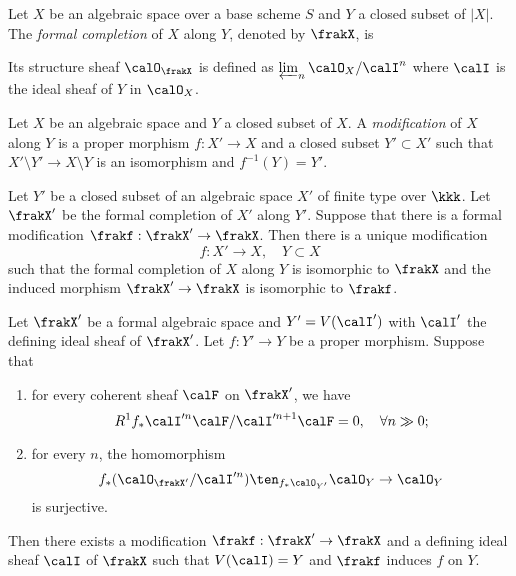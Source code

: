     \begin{definition}\label{def:formal_completion_of_algebraic_space}
        Let \(X\) be an algebraic space over a base scheme \(S\) and \(Y\) a closed subset of \(|X|\).
        The \emph{formal completion} of \(X\) along \(Y\), denoted by \(\frakX\), is 

        Its structure sheaf \(\calO_{\frakX}\) is defined as \(\varprojlim_n \calO_X / \calI^n\) where \(\calI\) is the ideal sheaf of \(Y\) in \(\calO_X\).
    \end{definition}

    \begin{definition}\label{def:modification}
        Let \(X\) be an algebraic space and \(Y\) a closed subset of \(X\).
        A \emph{modification} of \(X\) along \(Y\) is a proper morphism \(f: X' \to X\) and a closed subset \(Y' \subset X'\) such that \(X'\setminus Y' \to X \setminus Y\) is an isomorphism and \(f^{-1}(Y) = Y'\).
    \end{definition}

    \begin{theorem}\label{thm:Artin_existence_of_modification}
        Let \(Y'\) be a closed subset of an algebraic space \(X'\) of finite type over \(\kkk\).
        Let \(\frakX'\) be the formal completion of \(X'\) along \(Y'\).
        Suppose that there is a formal modification \(\frakf: \frakX' \to \frakX\).
        Then there is a unique modification 
        \[ f: X' \to X, \quad Y \subset X \]
        such that the formal completion of \(X\) along \(Y\) is isomorphic to \(\frakX\) and the induced morphism \(\frakX' \to \frakX\) is isomorphic to \(\frakf\).
    \end{theorem}

    \begin{theorem}\label{thm:Artin_higher_direct_image_and_modification}
        Let \(\frakX'\) be a formal algebraic space and \(Y' = V(\calI')\) with \(\calI'\) the defining ideal sheaf of \(\frakX'\).
        Let \(f:Y' \to Y\) be a proper morphism.
        Suppose that 
        \begin{enumerate}
            \item for every coherent sheaf \(\calF\) on \(\frakX'\), we have 
                \[ R^1f_* \calI'^n\calF/\calI'^{n+1}\calF = 0, \quad \forall n \gg 0; \]
            \item for every \(n\), the homomorphism 
                \[ f_*(\calO_{\frakX'} / \calI'^{n})\ten_{f_*\calO_{Y'}} \calO_Y \to \calO_Y \]
                is surjective.
        \end{enumerate}
        Then there exists a modification \(\frakf: \frakX' \to \frakX\) and a defining ideal sheaf \(\calI\) of \(\frakX\) such that \(V(\calI) = Y\) and \(\frakf\) induces \(f\) on \(Y\).
    \end{theorem}

